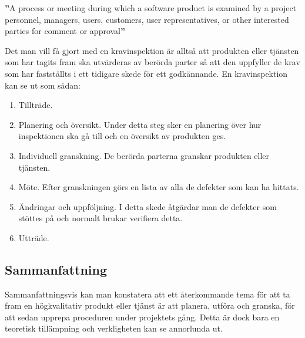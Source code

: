 \begin{tcolorbox}[boxrule=1pt,leftrule=5pt,arc=0pt,auto outer arc]
\textbf{''}A process or meeting during which a software product is examined by a project personnel, managers, users, customers, user representatives, or other interested parties for comment or approval\textbf{''} \cite{SFSR}
\end{tcolorbox}

\noindent
Det man vill få gjort med en kravinspektion är alltså att produkten eller tjänsten som har tagits fram ska utvärderas av berörda parter så att den uppfyller de krav som har fastställts i ett tidigare skede för ett godkännande. En kravinspektion kan se ut som sådan:
\begin{enumerate}
\item{Tillträde.}
\item{Planering och översikt. Under detta steg sker en planering över hur inspektionen ska gå till och en översikt av produkten ges.}
\item{Individuell granskning. De berörda parterna granskar produkten eller tjänsten.}
\item{Möte. Efter granskningen görs en lista av alla de defekter som kan ha hittats.}
\item{Ändringar och uppföljning. I detta skede åtgärdar man de defekter som stöttes på och normalt brukar verifiera detta.}
\item{Utträde.}
\end{enumerate}

\subsection{Sammanfattning}
Sammanfattningsvis kan man konstatera att ett återkommande tema för att ta fram en högkvalitativ produkt eller tjänst är att planera, utföra och granska, för att sedan upprepa proceduren under projektets gång. Detta är dock bara en teoretisk tillämpning och verkligheten kan se annorlunda ut.
